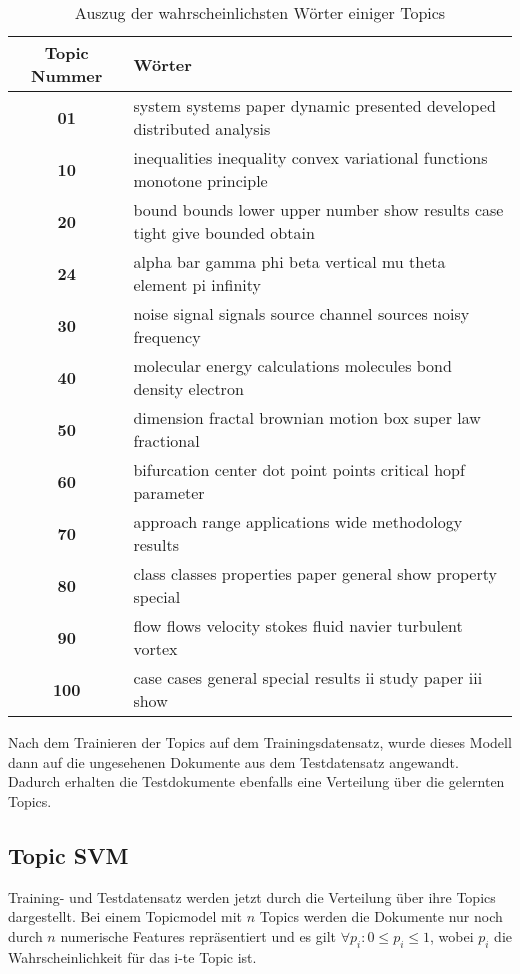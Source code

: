 \begin{table}[h]
    \centering
    \begin{tabular}{c|l}
        \small \textbf{Topic Nummer} & \small\textbf{Wörter}\\
        \hline
        \small \textbf{01} & \small system systems paper dynamic presented developed distributed analysis\\
        \small \textbf{10} & \small inequalities inequality convex variational functions monotone principle\\
        \small \textbf{20} & \small bound bounds lower upper number show results case tight give bounded obtain \\
        \small \textbf{24} & \small alpha bar gamma phi beta vertical mu theta element pi infinity \\
        \small \textbf{30} & \small noise signal signals source channel sources noisy frequency \\
        \small \textbf{40} & \small molecular energy calculations molecules bond density electron \\
        \small \textbf{50} & \small dimension fractal brownian motion box super law fractional \\
        \small \textbf{60} & \small bifurcation center dot point points critical hopf parameter \\
        \small \textbf{70} & \small approach range applications wide methodology results \\
        \small \textbf{80} & \small class classes properties paper general show property special \\
        \small \textbf{90} & \small flow flows velocity stokes fluid navier turbulent vortex \\
        \small \textbf{100}& \small case cases general special results ii study paper iii show
    \end{tabular}
    \caption{Auszug der wahrscheinlichsten Wörter einiger Topics}
    \label{tab:topics_words}
\end{table}

Nach dem Trainieren der Topics auf dem Trainingsdatensatz, wurde dieses Modell dann auf die ungesehenen Dokumente aus
dem Testdatensatz angewandt.
Dadurch erhalten die Testdokumente ebenfalls eine Verteilung über die gelernten Topics.

\subsection{Topic SVM}
\label{sub:topic_svm}
Training- und Testdatensatz werden jetzt durch die Verteilung über ihre Topics dargestellt.
Bei einem Topicmodel mit $n$ Topics
werden die Dokumente nur noch durch $n$ numerische Features repräsentiert und es gilt $\forall p_i: 0 \le p_i \le 1 $, wobei $p_i$
die Wahrscheinlichkeit für das i-te Topic ist.

